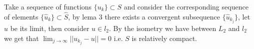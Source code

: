 \documentclass{article}
\begin{document}
Take a sequence of functions $\{u_k\}\subset S$ and consider the
corresponding sequence of elements $\{\hat u_k\}\subset \hat S$, by lema 3
there exists a convergent subsequence $\{\hat u_{k_j}\}$, let $\hat u$ be its
limit, then consider $u\in l_2$. By the isometry we have between $L_2$ and $l_2$
we get that $\lim_{j\to \infty}||u_{k_j}-u||=0$ i.e. $S$ is relatively compact.
\end{document}
